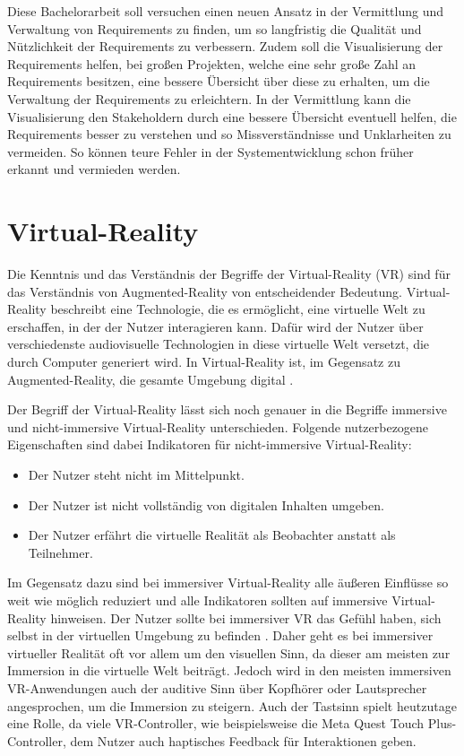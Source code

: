     Diese Bachelorarbeit soll versuchen einen neuen Ansatz in der Vermittlung und Verwaltung von Requirements zu finden, um so langfristig die Qualität und Nützlichkeit der Requirements zu verbessern.
    Zudem soll die Visualisierung der Requirements helfen, bei großen Projekten, welche eine sehr große Zahl an Requirements besitzen, eine bessere Übersicht über diese zu erhalten, um die Verwaltung der Requirements zu erleichtern.
    In der Vermittlung kann die Visualisierung den Stakeholdern durch eine bessere Übersicht eventuell helfen, die Requirements besser zu verstehen und so Missverständnisse und Unklarheiten zu vermeiden.
    So können teure Fehler in der Systementwicklung schon früher erkannt und vermieden werden.
    


  \section{Virtual-Reality}
  Die Kenntnis und das Verständnis der Begriffe der Virtual-Reality (VR) sind für das Verständnis von Augmented-Reality von entscheidender Bedeutung.
  Virtual-Reality beschreibt eine Technologie, die es ermöglicht, eine virtuelle Welt zu erschaffen, in der der Nutzer interagieren kann.
  Dafür wird der Nutzer über verschiedenste audiovisuelle Technologien in diese virtuelle Welt versetzt, die durch Computer generiert wird.
  In Virtual-Reality ist, im Gegensatz zu Augmented-Reality, die gesamte Umgebung digital
  \autocite[vgl.][S.15]{Dalton2023}.

  Der Begriff der Virtual-Reality lässt sich noch genauer in die Begriffe immersive und nicht-immersive Virtual-Reality unterschieden.
  Folgende nutzerbezogene Eigenschaften sind dabei Indikatoren für nicht-immersive Virtual-Reality:
  \begin{itemize}
    \item Der Nutzer steht nicht im Mittelpunkt.
    \item Der Nutzer ist nicht vollständig von digitalen Inhalten umgeben.
    \item Der Nutzer erfährt die virtuelle Realität als Beobachter anstatt als Teilnehmer.
  \end{itemize}
  Im Gegensatz dazu sind bei immersiver Virtual-Reality alle äußeren Einflüsse so weit wie möglich reduziert und alle Indikatoren sollten auf immersive Virtual-Reality hinweisen.
  Der Nutzer sollte bei immersiver VR das Gefühl haben, sich selbst in der virtuellen Umgebung zu befinden \autocite[vgl.][S.23-24]{Wolfel2023}.
  Daher geht es bei immersiver virtueller Realität oft vor allem um den visuellen Sinn, da dieser am meisten zur Immersion in die virtuelle Welt beiträgt.
  Jedoch wird in den meisten immersiven VR-Anwendungen auch der auditive Sinn über Kopfhörer oder Lautsprecher angesprochen, um die Immersion zu steigern.
  Auch der Tastsinn spielt heutzutage eine Rolle, da viele VR-Controller, wie beispielsweise die Meta Quest Touch Plus-Controller, dem Nutzer auch haptisches Feedback für Interaktionen geben.

